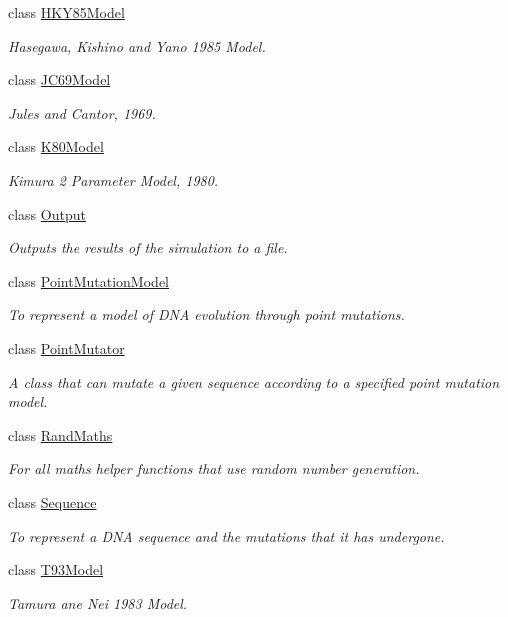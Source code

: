 \begin{DoxyCompactItemize}
class \hyperlink{classretrocombinator_1_1HKY85Model}{H\+K\+Y85\+Model}
\begin{DoxyCompactList}\small\item\em Hasegawa, Kishino and Yano 1985 Model. \end{DoxyCompactList}\item 
class \hyperlink{classretrocombinator_1_1JC69Model}{J\+C69\+Model}
\begin{DoxyCompactList}\small\item\em Jules and Cantor, 1969. \end{DoxyCompactList}\item 
class \hyperlink{classretrocombinator_1_1K80Model}{K80\+Model}
\begin{DoxyCompactList}\small\item\em Kimura 2 Parameter Model, 1980. \end{DoxyCompactList}\item 
class \hyperlink{classretrocombinator_1_1Output}{Output}
\begin{DoxyCompactList}\small\item\em Outputs the results of the simulation to a file. \end{DoxyCompactList}\item 
class \hyperlink{classretrocombinator_1_1PointMutationModel}{Point\+Mutation\+Model}
\begin{DoxyCompactList}\small\item\em To represent a model of D\+NA evolution through point mutations. \end{DoxyCompactList}\item 
class \hyperlink{classretrocombinator_1_1PointMutator}{Point\+Mutator}
\begin{DoxyCompactList}\small\item\em A class that can mutate a given sequence according to a specified point mutation model. \end{DoxyCompactList}\item 
class \hyperlink{classretrocombinator_1_1RandMaths}{Rand\+Maths}
\begin{DoxyCompactList}\small\item\em For all maths helper functions that use random number generation. \end{DoxyCompactList}\item 
class \hyperlink{classretrocombinator_1_1Sequence}{Sequence}
\begin{DoxyCompactList}\small\item\em To represent a D\+NA sequence and the mutations that it has undergone. \end{DoxyCompactList}\item 
class \hyperlink{classretrocombinator_1_1T93Model}{T93\+Model}
\begin{DoxyCompactList}\small\item\em Tamura ane Nei 1983 Model. \end{DoxyCompactList}\end{DoxyCompactItemize}

